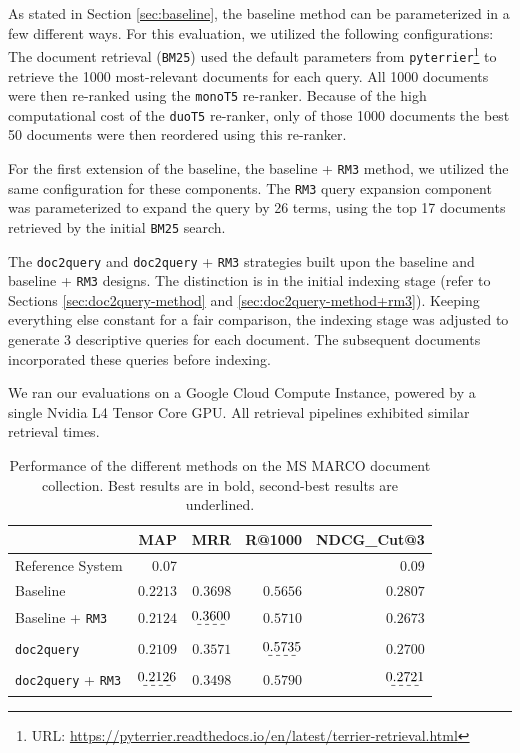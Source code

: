 \documentclass[sigconf]{acmart}
\begin{document}
As stated in Section \ref{sec:baseline}, the baseline method can be parameterized in a few different ways. For this evaluation, we utilized the following configurations: The document retrieval (\texttt{BM25}) used the default parameters from \texttt{pyterrier}\footnote{URL: \url{https://pyterrier.readthedocs.io/en/latest/terrier-retrieval.html}} to retrieve the 1000 most-relevant documents for each query. All 1000 documents were then re-ranked using the \texttt{monoT5} re-ranker. Because of the high computational cost of the \texttt{duoT5} re-ranker, only of those 1000 documents the best 50 documents were then reordered using this re-ranker.

For the first extension of the baseline, the baseline + \texttt{RM3} method, we utilized the same configuration for these components. The \texttt{RM3} query expansion component was parameterized to expand the query by 26 terms, using the top 17 documents retrieved by the initial \texttt{BM25} search.

The \texttt{doc2query} and \texttt{doc2query} + \texttt{RM3} strategies built upon the baseline and baseline + \texttt{RM3} designs. The distinction is in the initial indexing stage (refer to Sections \ref{sec:doc2query-method} and \ref{sec:doc2query-method+rm3}). Keeping everything else constant for a fair comparison, the indexing stage was adjusted to generate 3 descriptive queries for each document. The subsequent documents incorporated these queries before indexing.

We ran our evaluations on a Google Cloud Compute Instance, powered by a single Nvidia L4 Tensor Core GPU. All retrieval pipelines exhibited similar retrieval times.

\begin{table}[h]
\begin{center}
	\caption{Performance of the different methods on the MS MARCO document collection. Best results are in bold, second-best results are underlined.}
	\begin{tabular}{l|rrrr}
			& MAP & MRR & R@1000 & NDCG\_Cut@3 \\
		\hline
		Reference System & 0.07 &  &  & 0.09 \\
		Baseline & $\mathbf{0.2213}$ & $\mathbf{0.3698}$ & $0.5656$ & $\mathbf{0.2807}$ \\
		Baseline + \texttt{RM3} & $0.2124$ & $\dashuline{0.3600}$ & $0.5710$ & $0.2673$ \\
		\texttt{doc2query} & $0.2109$ & $0.3571$ & $\dashuline{0.5735}$ & $0.2700$ \\
		\texttt{doc2query} + \texttt{RM3} & $\dashuline{0.2126}$ & $0.3498$ & $\mathbf{0.5790}$ & $\dashuline{0.2721}$
	\end{tabular}
	\label{table:1}
\end{center}
\end{table}
\end{document}
